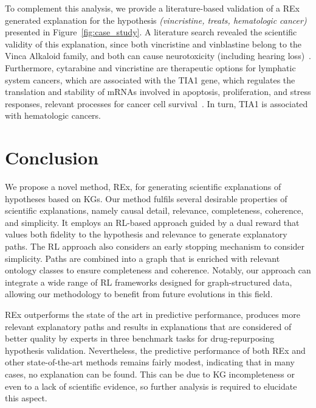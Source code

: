 \documentclass{article}
\theoremstyle{definition}
\begin{document}
To complement this analysis, we provide a literature-based validation of a REx generated explanation for the hypothesis \textit{(vincristine, treats, hematologic cancer)} presented in Figure~\ref{fig:case_study}. A literature search revealed the scientific validity of this explanation, since both vincristine and vinblastine belong to the Vinca Alkaloid family, and both can cause neurotoxicity (including hearing loss)~\cite{madsen2019aspects}. Furthermore, cytarabine and vincristine are therapeutic options for lymphatic system cancers, which are associated with the TIA1 gene, which regulates the translation and stability of mRNAs involved in apoptosis, proliferation, and stress responses, relevant processes for cancer cell survival~\cite{sanchez2015t}. In turn, TIA1 is associated with hematologic cancers. 

\section{Conclusion}
We propose a novel method, REx, for generating scientific explanations of hypotheses based on KGs. Our method fulfils several desirable properties of scientific explanations, namely causal detail, relevance, completeness, coherence, and simplicity. It employs an RL-based approach guided by a dual reward that values both fidelity to the hypothesis and relevance to generate explanatory paths. The RL approach also considers an early stopping mechanism to consider simplicity. Paths are combined into a graph that is enriched with relevant ontology classes to ensure completeness and coherence. Notably, our approach can integrate a wide range of RL frameworks designed for graph-structured data, allowing our methodology to benefit from future evolutions in this field. 

REx outperforms the state of the art in predictive performance, produces more relevant explanatory paths and results in explanations that are considered of better quality by experts in three benchmark tasks for drug-repurposing hypothesis validation.
Nevertheless, the predictive performance of both REx and other state-of-the-art methods remains fairly modest, indicating that in many cases, no explanation can be found. This can be due to KG incompleteness or even to a lack of scientific evidence, so further analysis is required to elucidate this aspect. 

\end{document}
